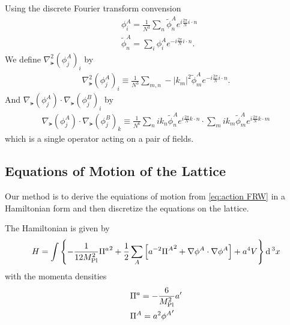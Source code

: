 Using the discrete Fourier transform convension
\begin{align}
  &\phi^A_i = \frac{1}{N^3}\sum_n\tilde{\phi}^A_n e^{i\frac{2\pi}{N}i\cdot n} \\
  &\tilde{\phi}^A_n = \sum_i\phi^A_i e^{-i\frac{2\pi}{N}i\cdot n}.
\end{align}
We define $\nabla^2_\lat(\phi^A_j)_i$ by
\begin{align} \label{eq:laplacian}
  \nabla^2_\lat(\phi^A_j)_i \equiv \frac{1}{N^3} \sum_{m,n} -|k_m|^2 \tilde{\phi}^A_m e^{-i\frac{2\pi}{N}i\cdot n}.
\end{align}
And $\nabla_\lat(\phi^A_j)\cdot\nabla_\lat(\phi^B_j)_i$ by 
\begin{align} \label{eq:grad dot grad}
  \nabla_\lat(\phi^A_j)\cdot\nabla_\lat(\phi^B_j)_k \equiv
  \frac{1}{N^6}\sum_nik_n\tilde{\phi}^A_ne^{i\frac{2\pi}{N}k\cdot n}\cdot\sum_mik_m\tilde{\phi}^A_me^{i\frac{2\pi}{N}k\cdot m}
\end{align}
which is a single operator acting on a pair of fields.

\subsection{Equations of Motion of the Lattice}
Our method is to derive the equiations of motion from \eqref{eq:action FRW} in a Hamiltonian form and then discretize the equations on the lattice.

The Hamiltonian is given by
\begin{equation}
  H = \int\left\{
    - \frac{1}{12M_{\mathrm{Pl}}^2}{\Pi^a}^2
    + \frac{1}{2}\sum_A\left[a^{-2}{\Pi^A}^2 + \nabla\phi^A\cdot\nabla\phi^A\right]
    + a^4V
    \right\}\mathrm{d}\,^3x
\end{equation}
with the momenta densities
\begin{align}
  & \Pi^a = -\frac{6}{M_{\mathrm{Pl}}^2}a'\\
  & \Pi^A = a^2{\phi^A}'
\end{align}

